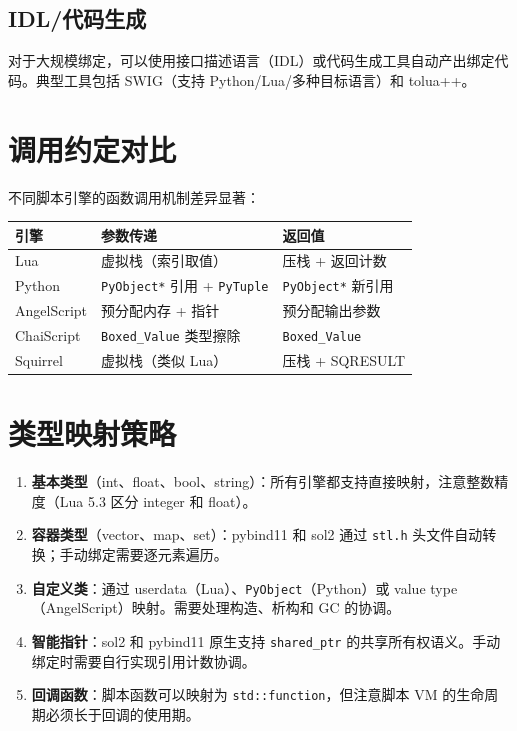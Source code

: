 \documentclass[12pt,a4paper,fontset=fandol]{ctexbook}
\newenvironment{guideline}[1][]{%
  \begin{tcolorbox}[enhanced,breakable,
    colback=blue!5!white,colframe=blue!75!black,
    boxed title style={colback=blue!75!black},
    attach boxed title to top left={yshift=-2mm,xshift=2mm},
    arc=2mm,boxrule=0.8mm,
    title={脚本集成要点},#1]}%
  {\end{tcolorbox}}
\newcommand{\Tp}[1]{\texttt{#1}}
\begin{document}
\subsection{IDL/代码生成}\label{sec:idl-binding}

对于大规模绑定，可以使用接口描述语言（IDL）或代码生成工具自动产出绑定代码。典型工具包括 SWIG（支持 Python/Lua/多种目标语言）和 tolua++。

\section{调用约定对比}\label{sec:call-conv}

不同脚本引擎的函数调用机制差异显著：

\begin{center}
\begin{tabularx}{\textwidth}{lXX}
\toprule
\textbf{引擎} & \textbf{参数传递} & \textbf{返回值} \\
\midrule
Lua & 虚拟栈（索引取值） & 压栈 + 返回计数 \\
Python & \Tp{PyObject*} 引用 + \Tp{PyTuple} & \Tp{PyObject*} 新引用 \\
AngelScript & 预分配内存 + 指针 & 预分配输出参数 \\
ChaiScript & \Tp{Boxed\_Value} 类型擦除 & \Tp{Boxed\_Value} \\
Squirrel & 虚拟栈（类似 Lua） & 压栈 + SQRESULT \\
\bottomrule
\end{tabularx}
\end{center}

\section{类型映射策略}\label{sec:type-mapping}

\begin{guideline}[title={通用类型映射原则}]
\begin{enumerate}
  \item \textbf{基本类型}（int、float、bool、string）：所有引擎都支持直接映射，注意整数精度（Lua 5.3 区分 integer 和 float）。
  \item \textbf{容器类型}（vector、map、set）：pybind11 和 sol2 通过 \Tp{stl.h} 头文件自动转换；手动绑定需要逐元素遍历。
  \item \textbf{自定义类}：通过 userdata（Lua）、\Tp{PyObject}（Python）或 value type（AngelScript）映射。需要处理构造、析构和 GC 的协调。
  \item \textbf{智能指针}：sol2 和 pybind11 原生支持 \Tp{shared\_ptr} 的共享所有权语义。手动绑定时需要自行实现引用计数协调。
  \item \textbf{回调函数}：脚本函数可以映射为 \Tp{std::function}，但注意脚本 VM 的生命周期必须长于回调的使用期。
\end{enumerate}
\end{guideline}
\end{document}
